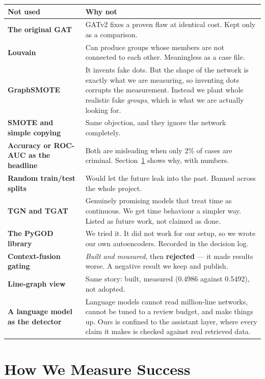 \documentclass[11pt,a4paper]{article}
\begin{document}
\begin{longtable}{@{}p{3.9cm}p{11.6cm}@{}}
\toprule
\textbf{Not used} & \textbf{Why not} \\
\midrule
\endhead
\textbf{The original GAT} & GATv2 fixes a proven flaw at identical cost. Kept
only as a comparison. \\
\textbf{Louvain} & Can produce groups whose members are not connected to each
other. Meaningless as a case file. \\
\textbf{GraphSMOTE} & It invents fake dots. But the shape of the network is
exactly what we are measuring, so inventing dots corrupts the measurement.
Instead we plant whole realistic fake \emph{groups}, which is what we are
actually looking for. \\
\textbf{SMOTE and simple copying} & Same objection, and they ignore the network
completely. \\
\textbf{Accuracy or ROC-AUC as the headline} & Both are misleading when only 2\%
of cases are criminal. Section~\ref{sec:metrics} shows why, with numbers. \\
\textbf{Random train/test splits} & Would let the future leak into the past.
Banned across the whole project. \\
\textbf{TGN and TGAT} & Genuinely promising models that treat time as continuous.
We get time behaviour a simpler way. Listed as future work, not claimed as
done. \\
\textbf{The PyGOD library} & We tried it. It did not work for our setup, so we
wrote our own autoencoders. Recorded in the decision log. \\
\textbf{Context-fusion gating} & \emph{Built and measured}, then \textbf{rejected}
--- it made results worse. A negative result we keep and publish. \\
\textbf{Line-graph view} & Same story: built, measured (0.4986 against 0.5492),
not adopted. \\
\textbf{A language model as the detector} & Language models cannot read
million-line networks, cannot be tuned to a review budget, and make things up.
Ours is confined to the assistant layer, where every claim it makes is checked
against real retrieved data. \\
\bottomrule
\end{longtable}

\section{How We Measure Success}
\label{sec:metrics}
\end{document}

